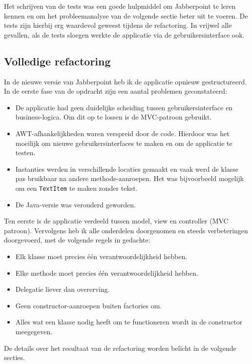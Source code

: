 \documentclass[a4paper]{article}
\newcommand{\code}[1]{\lstinline[columns=fixed]{#1}}
\begin{document}
    Het schrijven van de tests was een goede hulpmiddel om Jabberpoint te leren kennen en om het probleemanalyse van de volgende sectie beter uit te voeren.
	De tests zijn hierbij erg waardevol geweest tijdens de refactoring.
	In vrijwel alle gevallen, als de tests sloegen werkte de applicatie via de gebruikersinterface ook.

	\subsection*{Volledige refactoring}
	In de nieuwe versie van Jabberpoint heb ik de applicatie opnieuw gestructureerd.
	In de eerste fase van de opdracht zijn een aantal problemen geconstateerd:
	\begin{itemize}
		\item De applicatie had geen duidelijke scheiding tussen gebruikersinterface en business-logica.
			Om dit op te lossen is de MVC-patroon gebruikt.
		\item AWT-afhankelijkheden waren verspreid door de code.
			Hierdoor was het moeilijk om nieuwe gebruikersinterfaces te maken en om de applicatie te testen.
		\item Instanties werden in verschillende locaties gemaakt en vaak werd de klasse pas bruikbaar na andere methode-aanroepen.
			Het was bijvoorbeeld mogelijk om een \code{TextItem} te maken zonder tekst.
		\item De Java-versie was verouderd geworden.
	\end{itemize}

	Ten eerste is de applicatie verdeeld tussen model, view en controller (MVC patroon).
	Vervolgens heb ik alle onderdelen doorgenomen en steeds verbeteringen doorgevoerd, met de volgende regels in gedachte:
	\begin{itemize}
		\item Elk klasse moet precies één verantwoordelijkheid hebben.
		\item Elke methode moet precies één verantwoordelijkheid hebben.
		\item Delegatie liever dan overerving.
		\item Geen constructor-aanroepen buiten factories om.
		\item Alles wat een klasse nodig heeft om te functioneren wordt in de constructor meegegeven.
	\end{itemize}

	De details over het resultaat van de refactoring worden belicht in de volgende secties.
\end{document}

